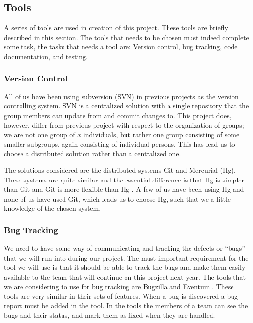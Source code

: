 \begin{comment}
There is more:
*Scrum board
*The phases / meetings
**estimation
**sprint planning
*Scrum meetings
*Scrum of scrum def
*project manager progblem
\end{comment}


\subsection{Tools}
A series of tools are used in creation of this project.
These tools are briefly described in this section.
The tools that needs to be chosen must indeed complete some task, the tasks that needs a tool are: Version control, bug tracking, code documentation, and testing.

\subsubsection{Version Control}
All of us have been using subversion (SVN) in previous projects as the version controlling system.
SVN is a centralized solution \cite{subversion} with a single repository that the group members can update from and commit changes to.
This project does, however, differ from previous project with respect to the organization of groups; we are not one group of $x$ individuals, but rather one group consisting of some smaller subgroups, again consisting of individual persons.
This has lead us to choose a distributed solution rather than a centralized one.

The solutions considered are the distributed systems Git and Mercurial (Hg).
These systems are quite similar and the essential difference is that Hg is simpler than Git and Git is more flexible than Hg \cite{gitVsHg}.
A few of us have been using Hg and none of us have used Git, which leads us to choose Hg, such that we a little knowledge of the chosen system.

\subsubsection{Bug Tracking}
We need to have some way of communicating and tracking the defects or ``bugs'' that we will run into during our project.
The must important requirement for the tool we will use is that it should be able to track the bugs and make them easily available to the team that will continue on this project next year.
The tools that we are considering to use for bug tracking are Bugzilla \cite{bugzillaFeat} and Eventum \cite{eventumFeat}.
These tools are very similar in their sets of features.
When a bug is discovered a bug report must be added in the tool.
In the tools the members of a team can see the bugs and their status, and mark them as fixed when they are handled.

